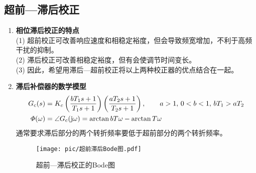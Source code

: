 \subsection{超前—滞后校正}\vspace*{-0.5em}
\begin{enumerate}[1. ]
	\item \textbf{相位滞后校正的特点}\\
	(1) 超前校正可改善响应速度和相稳定裕度，但会导致频宽增加，不利于高频干扰的抑制。\\
	(2) 滞后校正可改善相稳定裕度，但有会使调节时间变长。\\
	(3) 因此，希望用滞后—超前校正将以上两种校正器的优点结合在一起。
	
	\item \textbf{滞后补偿器的数学模型}
	\begin{align}
		G_{\text{c}}(s) &= K_c\left(\dfrac{bT_1s + 1}{T_1s + 1}\right) \left(\dfrac{aT_2s + 1}{T_2s + 1}\right), \quad \quad a>1, \, 0 < b < 1, \, bT_1 > aT_2\\
		\varPhi(\omega) &= \angle G_{\text{c}}(\text{j} \omega) = \arctan bT\omega - \arctan T\omega
	\end{align}
	通常要求滞后部分的两个转折频率要低于超前部分的两个转折频率。
	
	\begin{figure}[!htb]
		\centering
		\texttt{[image: pic/超前滞后Bode图.pdf]}
		\vspace*{-1em}
		\caption{超前—滞后校正的Bode图}
		\label{超前滞后Bode}
	\end{figure}
\end{enumerate}

\vspace*{-2.5em}


